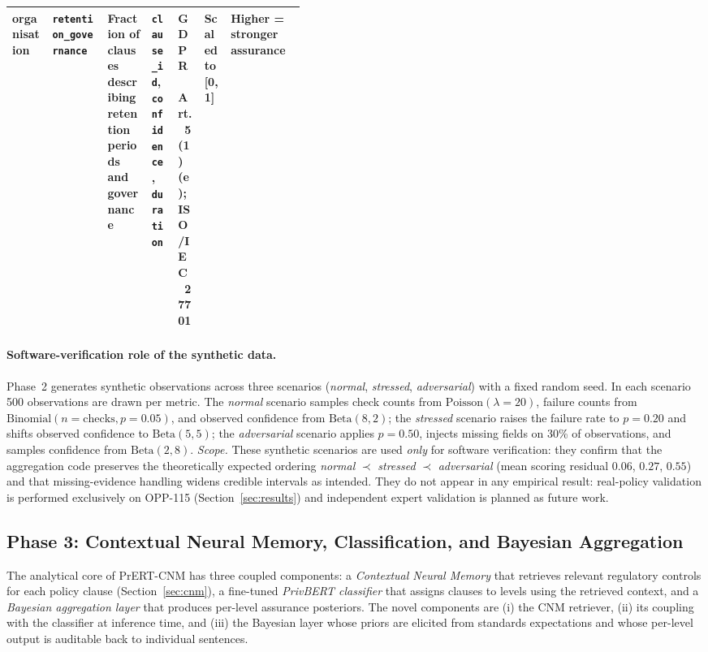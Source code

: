 \documentclass[final,3p,times,twocolumn]{elsarticle}
\begin{document}
\begin{table}
{\begin{tabular}{@{}ll>{\raggedright\arraybackslash}p{0.15\linewidth}>{\raggedright\arraybackslash}p{0.09\linewidth}>{\raggedright\arraybackslash}p{0.09\linewidth}>{\raggedright\arraybackslash}p{0.09\linewidth}l@{}}
			organisation            & \texttt{retention\_governance}  & Fraction of clauses describing retention periods and governance                          & \texttt{clause\_id}, \texttt{confidence}, \texttt{duration}      & GDPR~Art.~5(1)(e); ISO/IEC~27701           & Scaled to [0,1]        & Higher = stronger assurance \\
			\bottomrule
		\end{tabular}
        }
	\end{table}

	\paragraph{Software-verification role of the synthetic data.}
	Phase~2 generates synthetic observations across three scenarios (\emph{normal},
	\emph{stressed}, \emph{adversarial}) with a fixed random seed. In each scenario
	500 observations are drawn per metric. The \emph{normal} scenario samples check
	counts from $\text{Poisson}(\lambda{=}20)$, failure counts from
	$\text{Binomial}(n{=}\text{checks}, p{=}0.05)$, and observed confidence from $\text{Beta}
	(8, 2)$; the \emph{stressed} scenario raises the failure rate to $p{=}0.20$ and
	shifts observed confidence to $\text{Beta}(5, 5)$; the \emph{adversarial} scenario
	applies $p{=}0.50$, injects missing fields on 30\% of observations, and
	samples confidence from $\text{Beta}(2, 8)$. \emph{Scope.} These synthetic
	scenarios are used \emph{only} for software verification: they confirm that
	the aggregation code preserves the theoretically expected ordering \emph{normal}
	$\prec$ \emph{stressed} $\prec$ \emph{adversarial} (mean scoring residual
	$0.06$, $0.27$, $0.55$) and that missing-evidence handling widens credible intervals
	as intended. They do not appear in any empirical result: real-policy validation
	is performed exclusively on OPP-115 (Section~\ref{sec:results}) and independent
	expert validation is planned as future work. 
	\subsection{Phase 3: Contextual Neural Memory, Classification, and Bayesian Aggregation}
	\label{sec:phase3}
	The analytical core of PrERT-CNM has three coupled components: a \emph{Contextual
	Neural Memory} that retrieves relevant regulatory controls for each policy
	clause (Section~\ref{sec:cnm}), a fine-tuned \emph{PrivBERT classifier} that
	assigns clauses to levels using the retrieved context, and a \emph{Bayesian
	aggregation layer} that produces per-level assurance posteriors. The novel components
	are (i) the CNM retriever, (ii) its coupling with the classifier at inference
	time, and (iii) the Bayesian layer whose priors are elicited from standards expectations
	and whose per-level output is auditable back to individual sentences.
\end{document}
